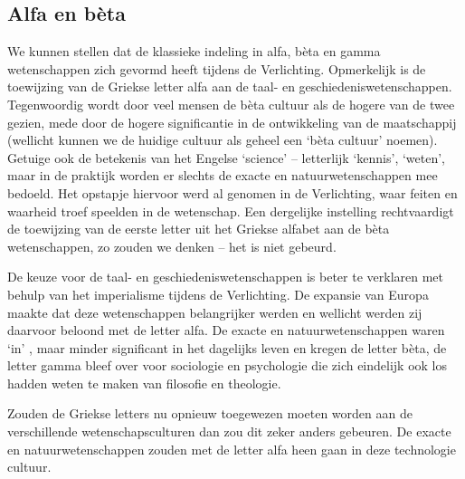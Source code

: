 \subsection{Alfa en b\`eta}\label{sec:alfaenbeta}

We kunnen stellen dat de klassieke indeling in alfa, b\`eta en gamma wetenschappen zich gevormd heeft tijdens de Verlichting. Opmerkelijk is de toewijzing van de Griekse letter alfa aan de taal- en geschiedeniswetenschappen. Tegenwoordig wordt door veel mensen de b\`eta cultuur als de hogere van de twee gezien, mede door de hogere significantie in de ontwikkeling van de maatschappij (wellicht kunnen we de huidige cultuur als geheel een `b\`eta cultuur' noemen). Getuige ook de betekenis van het Engelse `science' -- letterlijk `kennis', `weten', maar in de praktijk worden er slechts de exacte en natuurwetenschappen mee bedoeld. Het opstapje hiervoor werd al genomen in de Verlichting, waar feiten en waarheid troef speelden in de wetenschap. Een dergelijke instelling rechtvaardigt de toewijzing van de eerste letter uit het Griekse alfabet aan de b\`eta wetenschappen, zo zouden we denken -- het is niet gebeurd. 

De keuze voor de taal- en geschiedeniswetenschappen is beter te verklaren met behulp van het imperialisme tijdens de Verlichting. De expansie van Europa maakte dat deze wetenschappen belangrijker werden en wellicht werden zij daarvoor beloond met de letter alfa. De exacte en natuurwetenschappen waren `in' , maar minder significant in het dagelijks leven en kregen de letter b\`eta, de letter gamma bleef over voor sociologie en psychologie die zich eindelijk ook los hadden weten te maken van filosofie en theologie.

Zouden de Griekse letters nu opnieuw toegewezen moeten worden aan de verschillende wetenschapsculturen dan zou dit zeker anders gebeuren. De exacte en natuurwetenschappen zouden met de letter alfa heen gaan in deze technologie cultuur.
